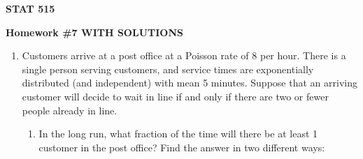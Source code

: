 \documentclass{article}
\begin{document}
\begin{center}
{\bf STAT 515}

{\bf Homework \#7 WITH SOLUTIONS}

\end{center}

\begin{enumerate}

  \item Customers arrive at a post office at a Poisson rate of 8 per hour. There
  is a single person serving customers, and service times are exponentially
  distributed (and independent) with mean 5 minutes. Suppose that an arriving
  customer will decide to wait in line if and only if there are two or fewer
  people already in line.
  
    \begin{enumerate}

    \item In the long run, what fraction of the time will there be at least 1
    customer in the post office? Find the answer in two different ways:

      \begin{enumerate}
      

\end{enumerate}
\end{enumerate}
\end{enumerate}
\end{document}
